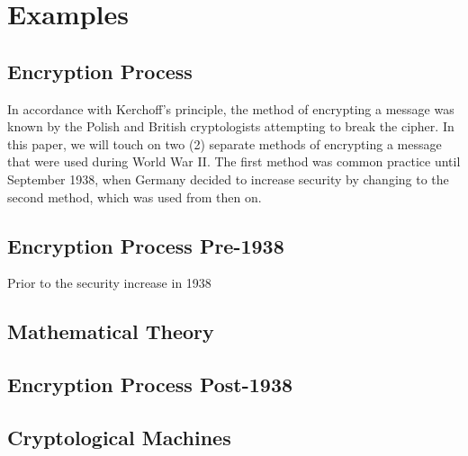 \chapter{Examples}\label{chap:examples}

\section{Encryption Process}

In accordance with Kerchoff's principle, the method of encrypting a message was known by the Polish and British cryptologists attempting to break the cipher. In this paper, we will touch on two (2) separate methods of encrypting a message that were used during World War II. The first method was common practice until September 1938, when Germany decided to increase security by changing to the second method, which was used from then on.

\section{Encryption Process Pre-1938}

Prior to the security increase in 1938

\section{Mathematical Theory}

\section{Encryption Process Post-1938}

\section{Cryptological Machines}
